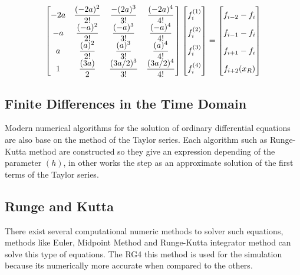 \begin{align}
\begin{bmatrix}
    -2a & \dfrac{(-2a)^2}{2!} & \dfrac{-(2a)^3}{3!} & \dfrac{(-2a)^4}{4!}\\
    -a & \dfrac{(-a)^2}{2!} & \dfrac{(-a)^3}{3!} & \dfrac{(-a)^4}{4!}\\
    a & \dfrac{(a)^2}{2!} & \dfrac{(a)^3}{3!} & \dfrac{(a)^4}{4!}\\
    1 & \dfrac{(3a)}{2} & \dfrac{(3a/2)^3}{3!} & \dfrac{(3a/2)^4}{4!}
\end{bmatrix}
\begin{bmatrix}
    f_i^{(1)}  \vphantom{ \dfrac{d^4}{d} }\\
    f_i^{(2)}  \vphantom{ \dfrac{d^4}{d} } \\
    f_i^{(3)}  \vphantom{ \dfrac{d^4}{d} } \\
    f_i^{(4)}  \vphantom{ \dfrac{d^4}{d} }
\end{bmatrix}
=
\begin{bmatrix}
    f_{i-2} - f_{i}    \vphantom{ \dfrac{d^4}{d}} \\
    f_{i-1} - f_{i}    \vphantom{ \dfrac{d^4}{d}} \\
    f_{i+1} - f_{i}    \vphantom{ \dfrac{d^4}{d}} \\
    f_{i+2}(x_R)   \vphantom{ \dfrac{d^4}{d}}
\end{bmatrix}
\end{align}


\cite{methods}

\subsection{Finite Differences in the Time Domain}



Modern numerical algorithms for the solution of ordinary differential equations are also base on the method of the Taylor series. Each algorithm such as Runge-Kutta method are constructed so they give an expression depending of the parameter $(h)$, in other works the step as an approximate solution of the first terms of the Taylor series.

\subsection{Runge and Kutta}

There exist several computational numeric methods to solver such equations, methods like Euler, Midpoint Method and Runge-Kutta integrator method can solve this type of equations. The RG4 this method is used for the simulation because its numerically more accurate when compared to the others.

